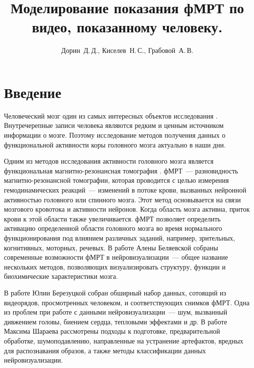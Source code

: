 \documentclass[12pt,twoside]{article}
\title
    [Моделирование показания фМРТ по видео, показанному человеку] %
    {Моделирование показания фМРТ по видео, показанному человеку.}
\author
    [Дорин~Д.\,Д.] %
    {Дорин~Д.\,Д., Киселев~Н.\,С., Грабовой~А.\,В.} %
    [Дорин~Д.\,Д.$^{1,2}$, Киселев~Н.\,С.$^{1,2}$, Грабовой~А.\,В.$^2$] %
\begin{document}
\maketitle
\section{Введение}
Человеческий мозг один из самых интересных объектов исследования \citep{Zhumakova}. 
Внутречерепные записи человека являются редким и ценным источником информации о мозге.
Поэтому исследование методов получения данных о функциональной активности коры 
головного мозга актуально в наши дни.

Одним из методов исследования активности головного мозга является функциональная магнитно-резонансная томография \citep{Ushakov}.
фМРТ~--- разновидность магнитно-резонансной томографии, которая проводится с целью измерения гемодинамических реакций~--- 
изменений в потоке крови, вызванных нейронной активностью головного или спинного мозга.
Этот метод основывается на связи мозгового кровотока и активности нейронов. Когда область мозга активна, 
приток крови к этой области также увеличивается. 
фМРТ позволяет определить активацию определенной области головного мозга во время нормального функционирования под 
влиянием различных заданий, например, зрительных, когнитивных,  моторных,  речевых.
В работе Алены Беляевской \citep{Belyaevskaya2018} собраны современные возможности фМРТ в нейровизуализации~--- 
общее название нескольких методов, позволяющих визуализировать структуру, функции и биохимические характеристики мозга.

В работе Юлии Березуцкой \citep{Berezutskaya2022} собран обширный набор данных, сотоящий из видеорядов, просмотренных 
человеком, и соответствующих снимков фМРТ. Одна из проблем при работе с данными нейровизуализации~--- шум, вызванный 
дивжением головы, биением сердца, тепловыми эффектами и др. 
В работе Максима Шараева \citep{https://doi.org/10.48550/arxiv.1804.10167} рассмотрены подходы к подготовке,
предварительной обработке, шумоподавлению, направленные на устранение артефактов, вредных 
для распознавания образов, а также методы классификации данных нейровизуализации.
\end{document}
